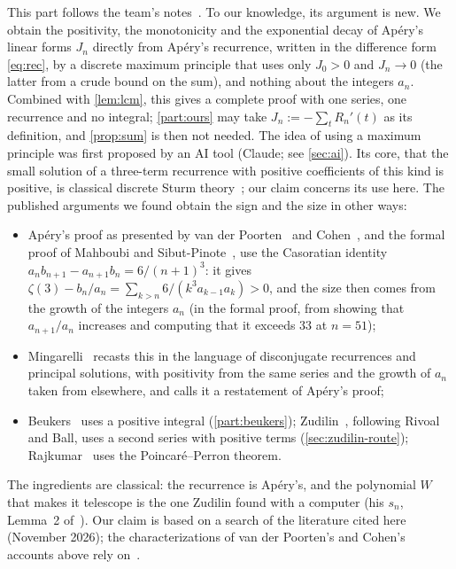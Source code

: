 \documentclass[11pt]{article}
\theoremstyle{plain}
\theoremstyle{definition}
\theoremstyle{remark}
\begin{document}
This part follows the team's notes~\cite{maxnotes}. To our knowledge, its argument is new. We obtain the
positivity, the monotonicity and the exponential decay of Ap\'ery's linear forms $J_n$ directly from
Ap\'ery's recurrence, written in the difference form \eqref{eq:rec}, by a discrete maximum
principle that uses only $J_0>0$ and $J_n\to0$ (the latter from a crude bound on the sum), and nothing
about the integers $a_n$. Combined with \cref{lem:lcm}, this gives a complete proof with one series,
one recurrence and no integral; \cref{part:ours} may take
$J_n:=-\sum_tR_n'(t)$ as its definition, and \cref{prop:sum} is then not needed. The idea of using a
maximum principle was first proposed by an AI tool (Claude; see \cref{sec:ai}). Its core, that the
small solution of a three-term recurrence with positive coefficients of this kind is positive, is
classical discrete Sturm theory~\cite{hartman}; our claim concerns its use here. The published
arguments we found obtain the sign and the size in other ways:
\begin{itemize}
  \item Ap\'ery's proof as presented by van der Poorten~\cite{vdp} and Cohen~\cite{cohen}, and the
    formal proof of Mahboubi and Sibut-Pinote~\cite{mahboubi,cmst}, use the Casoratian identity
    $a_nb_{n+1}-a_{n+1}b_n=6/(n+1)^3$: it gives $\zeta(3)-b_n/a_n=\sum_{k>n}6/(k^3a_{k-1}a_k)>0$,
    and the size then comes from the growth of the integers $a_n$ (in the formal proof, from showing
    that $a_{n+1}/a_n$ increases and computing that it exceeds $33$ at $n=51$);
  \item Mingarelli~\cite{mingarelli} recasts this in the language of disconjugate recurrences and
    principal solutions, with positivity from the same series and the growth of $a_n$ taken from
    elsewhere, and calls it a restatement of Ap\'ery's proof;
  \item Beukers~\cite{beukers79} uses a positive integral (\cref{part:beukers}); Zudilin~\cite{zudilin},
    following Rivoal and Ball, uses a second series with positive terms (\cref{sec:zudilin-route});
    Rajkumar~\cite{rajkumar} uses the Poincar\'e--Perron theorem.
\end{itemize}
The ingredients are classical: the recurrence is Ap\'ery's, and the polynomial $W$ that makes it
telescope is the one Zudilin found with a computer (his $s_n$, Lemma~2 of~\cite{zudilin}). Our claim
is based on a search of the literature cited here (November 2026); the characterizations of van der
Poorten's and Cohen's accounts above rely on~\cite{mahboubi,mingarelli}.
\end{document}
